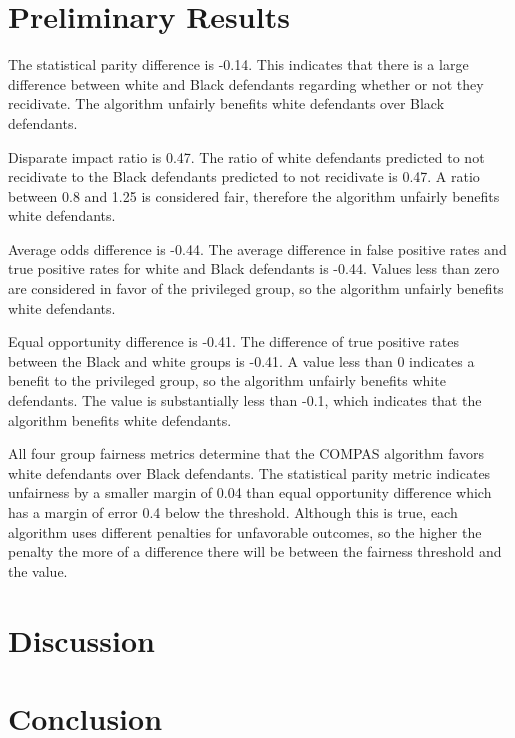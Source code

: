 \documentclass[water,article,submit,moreauthors,pdftex]{mdpi}
\begin{document}
\hypertarget{preliminary-results}{%
\section{Preliminary Results}\label{preliminary-results}}

The statistical parity difference is -0.14. This indicates that there is
a large difference between white and Black defendants regarding whether
or not they recidivate. The algorithm unfairly benefits white defendants
over Black defendants.

Disparate impact ratio is 0.47. The ratio of white defendants predicted
to not recidivate to the Black defendants predicted to not recidivate is
0.47. A ratio between 0.8 and 1.25 is considered fair, therefore the
algorithm unfairly benefits white defendants.

Average odds difference is -0.44. The average difference in false
positive rates and true positive rates for white and Black defendants is
-0.44. Values less than zero are considered in favor of the privileged
group, so the algorithm unfairly benefits white defendants.

Equal opportunity difference is -0.41. The difference of true positive
rates between the Black and white groups is -0.41. A value less than 0
indicates a benefit to the privileged group, so the algorithm unfairly
benefits white defendants. The value is substantially less than -0.1,
which indicates that the algorithm benefits white defendants.

All four group fairness metrics determine that the COMPAS algorithm
favors white defendants over Black defendants. The statistical parity
metric indicates unfairness by a smaller margin of 0.04 than equal
opportunity difference which has a margin of error 0.4 below the
threshold. Although this is true, each algorithm uses different
penalties for unfavorable outcomes, so the higher the penalty the more
of a difference there will be between the fairness threshold and the
value.

\hypertarget{discussion}{%
\section{Discussion}\label{discussion}}

\hypertarget{conclusion}{%
\section{Conclusion}\label{conclusion}}
\end{document}
